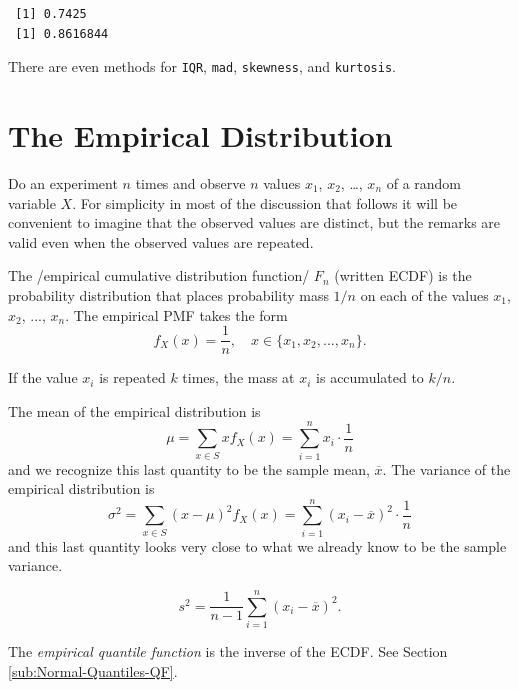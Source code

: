\documentclass[captions=tableheading]{scrbook}
\begin{document}
\begin{verbatim}
 [1] 0.7425
 [1] 0.8616844
\end{verbatim}

There are even methods for \texttt{IQR}, \texttt{mad}, \texttt{skewness}, and \texttt{kurtosis}.
\section{The Empirical Distribution}
\label{sec-1-5}

\label{sec:empirical-distribution}

Do an experiment \(n\) times and observe \(n\) values \(x_{1}\), \(x_{2}\), \ldots{}, \(x_{n}\) of a random variable \(X\). For simplicity in most of the discussion that follows it will be convenient to imagine that the observed values are distinct, but the remarks are valid even when the observed values are repeated. 

\begin{defn}
The /empirical cumulative distribution function/ \(F_{n}\) (written ECDF) is the probability distribution that places probability mass \(1/n\) on each of the values \(x_{1}\), \(x_{2}\), ..., \(x_{n}\). The empirical PMF takes the form
\begin{equation} 
f_{X}(x)=\frac{1}{n},\quad x\in \{ x_{1},x_{2},...,x_{n} \}.
\end{equation}

If the value \(x_{i}\) is repeated \(k\) times, the mass at \(x_{i}\) is accumulated to \(k/n\).
\end{defn}


The mean of the empirical distribution is
\begin{equation}
\mu=\sum_{x\in S}xf_{X}(x)=\sum_{i=1}^{n}x_{i}\cdot\frac{1}{n}
\end{equation}
and we recognize this last quantity to be the sample mean, \(\overline{x}\). The variance of the empirical distribution is
\begin{equation}
\sigma^{2}=\sum_{x\in S}(x-\mu)^{2}f_{X}(x)=\sum_{i=1}^{n}(x_{i}-\overline{x})^{2}\cdot\frac{1}{n}
\end{equation}
and this last quantity looks very close to what we already know to be the sample variance.

\begin{equation}
s^{2}=\frac{1}{n-1}\sum_{i=1}^{n}(x_{i}-\overline{x})^{2}.
\end{equation}

The \emph{empirical quantile function} is the inverse of the ECDF. See Section \ref{sub:Normal-Quantiles-QF}.
\end{document}
